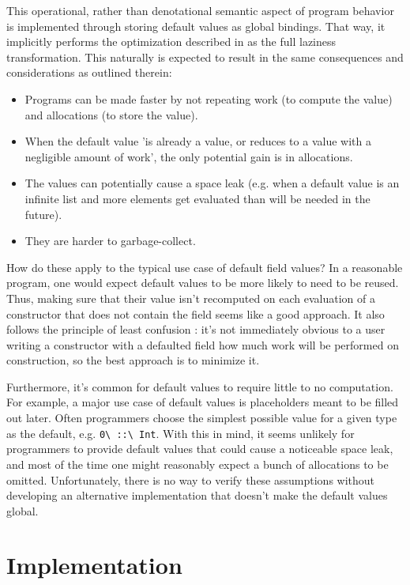 \documentclass[en]{pracamgr}
\newcommand{\code}[1]{\lstinline[breaklines=true]{#1}}
\begin{document}
This operational, rather than denotational semantic aspect of program behavior is implemented through
storing default values as global bindings.
That way, it implicitly performs the optimization described in \cite{partain1996let-floating} as the full laziness transformation. 
This naturally is expected to result in the same consequences and considerations as outlined therein:
\begin{itemize}
  \item Programs can be made faster by not repeating work (to compute the value) and allocations (to store the value).
  \item When the default value 'is already a value, or reduces to a value with a negligible amount of work', the only potential gain is in allocations.
  \item The values can potentially cause a space leak 
    (e.g. when a default value is an infinite list and more elements get evaluated than will be needed in the future).
  \item They are harder to garbage-collect.
\end{itemize}
How do these apply to the typical use case of default field values?
In a reasonable program, one would expect default values to be more likely to need to be reused.
Thus, making sure that their value isn't recomputed on each evaluation of a constructor that does not contain the field seems like a good approach.
It also follows the principle of least confusion \cite{saltzer2009principles}: 
it's not immediately obvious to a user writing a constructor with a defaulted field how much work will be performed on construction,
so the best approach is to minimize it.

Furthermore, it's common for default values to require little to no computation. 
For example, a major use case of default values is placeholders meant to be filled out later. 
Often programmers choose the simplest possible value for a given type as the default, e.g. \code{0\ ::\ Int}.
With this in mind, it seems unlikely for programmers to provide default values that could cause a noticeable space leak, and most of the time one might
reasonably expect a bunch of allocations to be omitted.
Unfortunately, there is no way to verify these assumptions without developing an alternative implementation that doesn't make the default values global.


\chapter{Implementation}\label{ch:impl}
\end{document}
